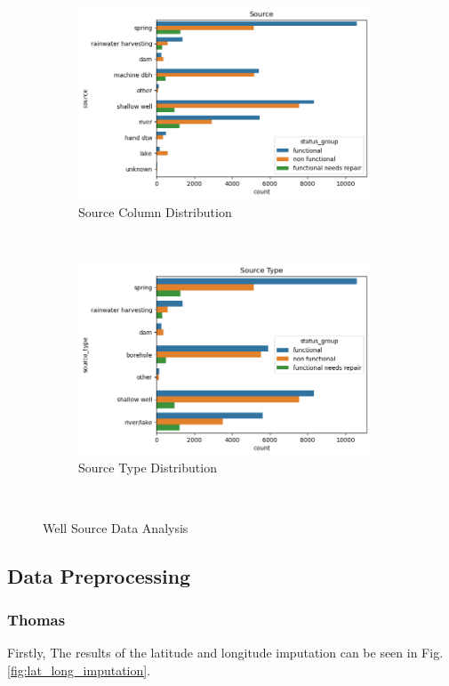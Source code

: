 \documentclass[conference]{IEEEtran}
\begin{document}
\begin{figure}[t]
    \centering
    \begin{subfigure}[t]{0.5\textwidth}
      \centering
      \includegraphics[height=2.25in]{figures/jason_source.png}
      \caption{Source Column Distribution}
    \end{subfigure}%
    ~
    \begin{subfigure}[t]{0.5\textwidth}
      \centering
      \includegraphics[height=2.25in]{figures/jason_sourcetype.png}
      \caption{Source Type Distribution}
    \end{subfigure}
    ~
    \caption{Well Source Data Analysis}
    \label{fig:source}
\end{figure}

\subsection{Data Preprocessing}

\subsubsection{Thomas}

Firstly, The results of the latitude and longitude imputation can be seen in Fig. \ref{fig:lat_long_imputation}.
\end{document}

